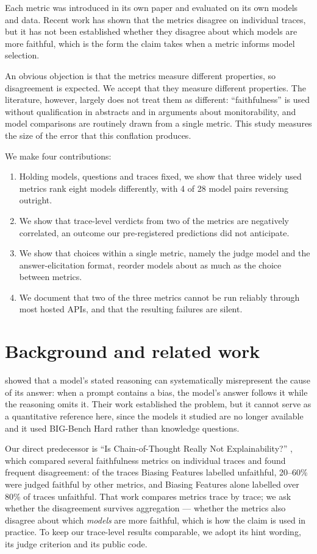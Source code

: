\documentclass[11pt]{article}
\begin{document}
Each metric was introduced in its own paper and evaluated on its own models and data. Recent
work has shown that the metrics disagree on individual traces, but it has not been established
whether they disagree about which models are more faithful, which is the form the claim takes
when a metric informs model selection.

An obvious objection is that the metrics measure different properties, so disagreement is
expected. We accept that they measure different properties. The literature, however, largely
does not treat them as different: ``faithfulness'' is used without qualification in abstracts
and in arguments about monitorability, and model comparisons are routinely drawn from a single
metric. This study measures the size of the error that this conflation produces.

We make four contributions:
\begin{enumerate}
  \item Holding models, questions and traces fixed, we show that three widely used metrics rank
        eight models differently, with 4 of 28 model pairs reversing outright.
  \item We show that trace-level verdicts from two of the metrics are negatively correlated, an
        outcome our pre-registered predictions did not anticipate.
  \item We show that choices within a single metric, namely the judge model and the
        answer-elicitation format, reorder models about as much as the choice between metrics.
  \item We document that two of the three metrics cannot be run reliably through most hosted
        APIs, and that the resulting failures are silent.
\end{enumerate}

\section{Background and related work}

\citet{turpin2023} showed that a model's stated reasoning can systematically misrepresent the
cause of its answer: when a prompt contains a bias, the model's answer follows it while the
reasoning omits it. Their work established the problem, but it cannot serve as a quantitative
reference here, since the models it studied are no longer available and it used BIG-Bench Hard
rather than knowledge questions.

Our direct predecessor is ``Is Chain-of-Thought Really Not Explainability?''
\citep{zaman2025}, which compared several faithfulness metrics on individual traces and found
frequent disagreement: of the traces Biasing Features labelled unfaithful, 20--60\% were judged
faithful by other metrics, and Biasing Features alone labelled over 80\% of traces unfaithful.
That work compares metrics trace by trace; we ask whether the disagreement survives
aggregation --- whether the metrics also disagree about which \emph{models} are more faithful,
which is how the claim is used in practice. To keep our trace-level results comparable, we
adopt its hint wording, its judge criterion and its public code.
\end{document}
